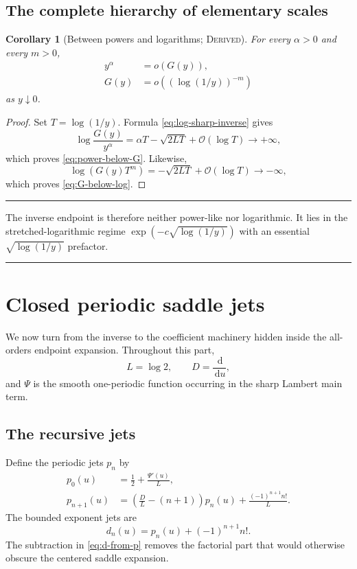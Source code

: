 \documentclass[11pt,oneside]{article}
\newtheorem{corollary}[theorem]{Corollary}
\theoremstyle{definition}
\theoremstyle{remark}
\newcommand{\dd}{\,\mathrm d}
\newcommand{\bigO}{\mathcal O}
\newenvironment{boxedremark}{%
  \par\smallskip\noindent\begin{center}\begin{minipage}{0.94\textwidth}%
  \color{black}\hrule\vspace{0.6em}\small
}{%
  \vspace{0.6em}\hrule\end{minipage}\end{center}\smallskip
}
\newcommand{\InvF}{G}
\newcommand{\Derived}{\textsc{Derived}}
\begin{document}
\subsection{The complete hierarchy of elementary scales}

\begin{corollary}[Between powers and logarithms; \Derived]
\label{cor:inverse-scale-hierarchy}
For every $\alpha>0$ and every $m>0$,
\begin{align}
 y^\alpha&=o(\InvF(y)), \label{eq:power-below-G}\\
 \InvF(y)&=o\!\left((\log(1/y))^{-m}\right)
 \label{eq:G-below-log}
\end{align}
as $y\downarrow0$.
\end{corollary}

\begin{proof}
Set $T=\log(1/y)$.  Formula \eqref{eq:log-sharp-inverse} gives
\[
 \log\frac{\InvF(y)}{y^\alpha}
 =\alpha T-\sqrt{2LT}+\bigO(\log T)\longrightarrow+\infty,
\]
which proves \eqref{eq:power-below-G}.  Likewise,
\[
 \log\!\left(\InvF(y)T^m\right)
 =-\sqrt{2LT}+\bigO(\log T)\longrightarrow-\infty,
\]
which proves \eqref{eq:G-below-log}.
\end{proof}

\begin{boxedremark}
The inverse endpoint is therefore neither power-like nor logarithmic.
It lies in the stretched-logarithmic regime
$\exp(-c\sqrt{\log(1/y)})$ with an essential
$\sqrt{\log(1/y)}$ prefactor.
\end{boxedremark}

\section{Closed periodic saddle jets}
\label{sec:closed-jets}

We now turn from the inverse to the coefficient machinery hidden inside
the all-orders endpoint expansion.  Throughout this part,
\[
 L=\log2,\qquad D=\frac{\dd}{\dd u},
\]
and $\Psi$ is the smooth one-periodic function occurring in the sharp
Lambert main term.

\subsection{The recursive jets}

Define the periodic jets $p_n$ by
\begin{align}
 p_0(u)&=\frac12+\frac{\Psi'(u)}L, \label{eq:p0}\\
 p_{n+1}(u)
 &=\left(\frac DL-(n+1)\right)p_n(u)
   +\frac{(-1)^{n+1}n!}{L}. \label{eq:p-recurrence}
\end{align}
The bounded exponent jets are
\begin{equation}
 d_n(u)=p_n(u)+(-1)^{n+1}n!. \label{eq:d-from-p}
\end{equation}
The subtraction in \eqref{eq:d-from-p} removes the factorial part that
would otherwise obscure the centered saddle expansion.
\end{document}
